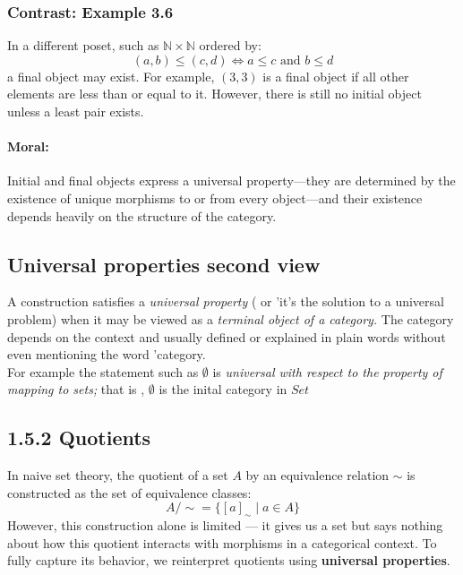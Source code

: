 \documentclass[10pt]{article}
\theoremstyle{plain}
\theoremstyle{definition}
\begin{document}
  \subsubsection*{Contrast: Example 3.6}
  
  In a different poset, such as $\mathbb{N} \times \mathbb{N}$ ordered by:
  \[
  (a, b) \le (c, d) \iff a \le c \text{ and } b \le d
  \]
  a final object may exist. For example, $(3,3)$ is a final object if all other elements are less than or equal to it. However, there is still no initial object unless a least pair exists.
  
  \paragraph{Moral:} Initial and final objects express a universal property—they are determined by the existence of unique morphisms to or from every object—and their existence depends heavily on the structure of the category.
  
  \subsection*{Universal properties second view}
  A construction satisfies a \textit{universal property} ( or 'it's the solution to a universal problem) when it may be viewed as a \textit{terminal object of a category.} The category depends on the context and usually defined or explained in plain words without even mentioning the word 'category. \\
  
  For example the statement such as $\emptyset$ is \textit{universal with respect to the property of mapping to sets;} that is , $\emptyset$ is the inital category in $Set$
  
  \subsection*{1.5.2 Quotients}
  
  In naive set theory, the quotient of a set $A$ by an equivalence relation $\sim$ is constructed as the set of equivalence classes:
  \[
  A/{\sim} = \{ [a]_{\sim} \mid a \in A \}
  \]
  However, this construction alone is limited — it gives us a set but says nothing about how this quotient interacts with morphisms in a categorical context. To fully capture its behavior, we reinterpret quotients using \textbf{universal properties}.
  
\end{document}
